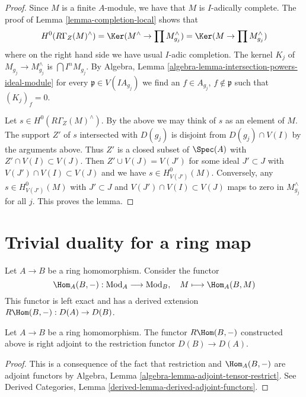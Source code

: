 \begin{proof}
Since $M$ is a finite $A$-module, we have that $M$ is $I$-adically complete.
The proof of Lemma \ref{lemma-completion-local} shows that
$$
H^0(R\Gamma_Z(M)^\wedge) =
\Ker(M^\wedge \to \prod M_{g_j}^\wedge) =
\Ker(M \to \prod M_{g_j}^\wedge)
$$
where on the right hand side we have usual $I$-adic completion.
The kernel $K_j$ of $M_{g_j} \to M_{g_j}^\wedge$ is $\bigcap I^n M_{g_j}$.
By Algebra, Lemma \ref{algebra-lemma-intersection-powers-ideal-module}
for every $\mathfrak p \in V(IA_{g_j})$ we find an
$f \in A_{g_j}$, $f \not \in \mathfrak p$ such that $(K_j)_f = 0$.

\medskip\noindent
Let $s \in H^0(R\Gamma_Z(M)^\wedge)$.
By the above we may think of $s$ as an element of $M$.
The support $Z'$ of $s$ intersected with $D(g_j)$ is disjoint from
$D(g_j) \cap V(I)$ by the arguments above.
Thus $Z'$ is a closed subset of $\Spec(A)$ with $Z' \cap V(I) \subset V(J)$.
Then $Z' \cup V(J) = V(J')$ for some ideal $J' \subset J$ with
$V(J') \cap V(I) \subset V(J)$ and we have $s \in H^0_{V(J')}(M)$.
Conversely, any $s \in H^0_{V(J')}(M)$ with $J' \subset J$ and
$V(J') \cap V(I) \subset V(J)$ maps to zero in $M_{g_j}^\wedge$ for all $j$.
This proves the lemma.
\end{proof}









\section{Trivial duality for a ring map}
\label{section-trivial}

\noindent
Let $A \to B$ be a ring homomorphism. Consider the functor
$$
\Hom_A(B, -) : \text{Mod}_A \longrightarrow \text{Mod}_B,\quad
M \longmapsto \Hom_A(B, M)
$$
This functor is left exact and has a derived extension
$R\Hom(B, -) : D(A) \to D(B)$.

\begin{lemma}
\label{lemma-right-adjoint}
Let $A \to B$ be a ring homomorphism. The functor $R\Hom(B, -)$
constructed above is right adjoint to the restriction functor
$D(B) \to D(A)$.
\end{lemma}

\begin{proof}
This is a consequence of the fact that restriction and $\Hom_A(B, -)$ are
adjoint functors by Algebra, Lemma \ref{algebra-lemma-adjoint-tensor-restrict}.
See Derived Categories, Lemma \ref{derived-lemma-derived-adjoint-functors}.
\end{proof}

